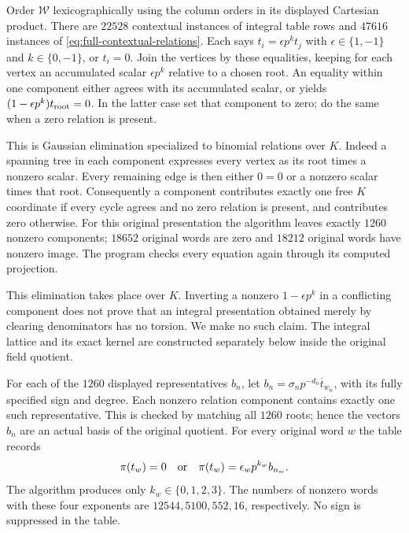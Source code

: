 Order $\mathcal W$ lexicographically using the column orders in
its displayed Cartesian product. There are $22528$ contextual
instances of integral table rows and $47616$ instances of
\eqref{eq:full-contextual-relations}. Each says
$t_i=\epsilon p^kt_j$ with $\epsilon\in\{1,-1\}$ and
$k\in\{0,-1\}$, or $t_i=0$.
Join the vertices by these equalities, keeping for each vertex
an accumulated scalar $\epsilon p^k$ relative to a chosen root.
An equality within one component either agrees with its
accumulated scalar, or yields
$(1-\epsilon p^k)t_{\rm root}=0$. In the latter case set that
component to zero; do the same when a zero relation is present.

This is Gaussian elimination specialized to binomial relations
over $K$. Indeed a spanning tree in each component expresses
every vertex as its root times a nonzero scalar. Every remaining
edge is then either $0=0$ or a nonzero scalar times that root.
Consequently a component contributes exactly one free $K$
coordinate if every cycle agrees and no zero relation is present,
and contributes zero otherwise. For this original presentation
the algorithm leaves exactly $1260$ nonzero components; $18652$
original words are zero and $18212$ original words have nonzero
image. The program checks every equation again through its
computed projection.

This elimination takes place over $K$. Inverting a nonzero
$1-\epsilon p^k$ in a conflicting component does not prove that
an integral presentation obtained merely by clearing denominators
has no torsion. We make no such claim. The integral lattice and
its exact kernel are constructed separately below inside the
original field quotient.



For each of the $1260$ displayed representatives $b_n$, let
$b_n=\sigma_n p^{-d_n}\overline t_{w_n}$, with its fully
specified sign and degree. Each nonzero relation component
contains exactly one such representative. This is checked by
matching all $1260$ roots; hence the vectors $b_n$ are an actual
basis of the original quotient. For every original word $w$
the table records
\begin{equation}\label{eq:full-tab-projection}
 \pi(t_w)=0\quad\hbox{or}\quad
 \pi(t_w)=\epsilon_w p^{k_w}b_{n_w}.
\end{equation}
The algorithm produces only $k_w\in\{0,1,2,3\}$.
The numbers of nonzero words with these four exponents are
$12544,5100,552,16$, respectively. No sign is suppressed in
the table.


